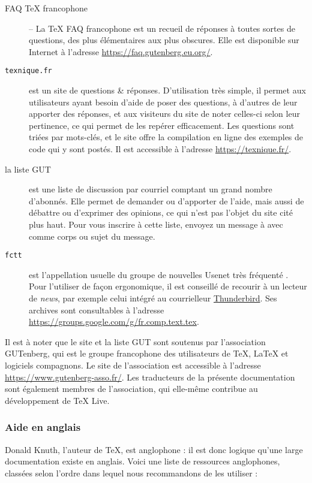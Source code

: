 \documentclass[german, english, french]{article}
\renewcommand{\TL}{\TeX{} Live\xspace}%
\begin{document}
\begin{description}
\item [FAQ \TeX{} francophone] -- La \TeX{} FAQ francophone est un recueil de
  réponses à toutes sortes de questions, des plus élémentaires aux plus
  obscures. Elle est disponible sur Internet à l'adresse
  \url{https://faq.gutenberg.eu.org/}.

\item[\texttt{texnique.fr}] est un site de questions \& réponses.  D'utilisation
  très simple, il permet aux utilisateurs ayant besoin d'aide de poser des
  questions, à d'autres de leur apporter des réponses, et aux visiteurs du site
  de noter celles-ci selon leur pertinence, ce qui permet de les repérer
  efficacement.  Les questions sont triées par mots-clés, et le site offre la
  compilation en ligne des exemples de code qui y sont postés.  Il est
  accessible à l'adresse \url{https://texnique.fr/}.

\item[la liste GUT] est une liste de discussion par courriel comptant un grand
  nombre d'abonnés.  Elle permet de demander ou d'apporter de l'aide, mais aussi
  de débattre ou d'exprimer des opinions, ce qui n'est pas l'objet du site cité
  plus haut.  Pour vous inscrire à cette liste, envoyez un message
  à  avec  comme corps ou sujet du
  message.

\item[\texttt{fctt}] est l'appellation usuelle du groupe de nouvelles Usenet
  très fréquenté . Pour l'utiliser de façon ergonomique,
  il est conseillé de recourir à un lecteur de \emph{news}, par exemple celui
  intégré au courrielleur
  \href{https://www.mozilla.org/fr/thunderbird/}{Thunderbird}.  Ses archives
  sont consultables à l'adresse
  \url{https://groups.google.com/g/fr.comp.text.tex}.
\end{description}
Il est à noter que le site  et la liste GUT sont soutenus
par l'association GUTenberg, qui est le groupe francophone des utilisateurs de
\TeX{}, \LaTeX{} et logiciels compagnons. Le site de l'association est
accessible à l'adresse \url{https://www.gutenberg-asso.fr/}.  Les traducteurs de
la présente documentation sont également membres de l'association, qui elle-même
contribue au développement de \TL{}.

\subsubsection{Aide en anglais}
Donald Knuth, l'auteur de \TeX, est anglophone : il est donc logique qu'une
large documentation existe en anglais. Voici une liste de ressources
anglophones, classées selon l'ordre dans lequel nous recommandons de les
utiliser :
\end{document}
